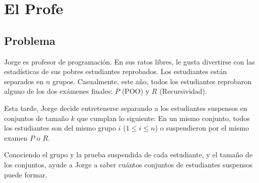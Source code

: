 \documentclass{article}
\begin{document}
	\section{El Profe}

	\subsection{Problema}
	Jorge es profesor de programación. En sus ratos libres, le gusta divertirse con las estadísticas de sus pobres estudiantes reprobados. Los estudiantes están separados en $n$ grupos. Casualmente, este año, todos los estudiantes reprobaron alguno de los dos exámenes finales: $P$ (POO) y $R$ (Recursividad).

Esta tarde, Jorge decide entretenerse separando a los estudiantes suspensos en conjuntos de tamaño $k$ que cumplan lo siguiente: En un mismo conjunto, todos los estudiantes son del mismo grupo $i$ ($1 \leq i \leq n$) o suspendieron por el mismo examen $P$ o $R$.

Conociendo el grupo y la prueba suspendida de cada estudiante, y el tamaño de los conjuntos, ayude a Jorge a saber cuántos conjuntos de estudiantes suspensos puede formar.
\end{document}

